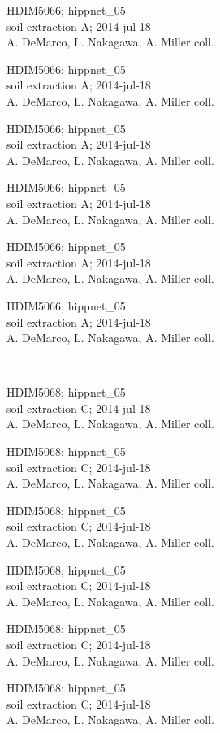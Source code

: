 \documentclass[2pt]{extarticle}
\begin{document}
\noindent
\parbox{0.16\textwidth}{\tiny \raggedright \rule[-0.3\baselineskip]{0pt}{10pt}HDIM5066; hippnet\_05\\ soil extraction A; 2014-jul-18\\ A. DeMarco, L. Nakagawa, A. Miller coll.}
\parbox{0.16\textwidth}{\tiny \raggedright \rule[-0.3\baselineskip]{0pt}{10pt}HDIM5066; hippnet\_05\\ soil extraction A; 2014-jul-18\\ A. DeMarco, L. Nakagawa, A. Miller coll.}
\parbox{0.16\textwidth}{\tiny \raggedright \rule[-0.3\baselineskip]{0pt}{10pt}HDIM5066; hippnet\_05\\ soil extraction A; 2014-jul-18\\ A. DeMarco, L. Nakagawa, A. Miller coll.}
\parbox{0.16\textwidth}{\tiny \raggedright \rule[-0.3\baselineskip]{0pt}{10pt}HDIM5066; hippnet\_05\\ soil extraction A; 2014-jul-18\\ A. DeMarco, L. Nakagawa, A. Miller coll.}
\parbox{0.16\textwidth}{\tiny \raggedright \rule[-0.3\baselineskip]{0pt}{10pt}HDIM5066; hippnet\_05\\ soil extraction A; 2014-jul-18\\ A. DeMarco, L. Nakagawa, A. Miller coll.}
\parbox{0.16\textwidth}{\tiny \raggedright \rule[-0.3\baselineskip]{0pt}{10pt}HDIM5066; hippnet\_05\\ soil extraction A; 2014-jul-18\\ A. DeMarco, L. Nakagawa, A. Miller coll.} \\ 
\vspace{0.001in} 

\noindent
\parbox{0.16\textwidth}{\tiny \raggedright \rule[-0.3\baselineskip]{0pt}{10pt}HDIM5068; hippnet\_05\\ soil extraction C; 2014-jul-18\\ A. DeMarco, L. Nakagawa, A. Miller coll.}
\parbox{0.16\textwidth}{\tiny \raggedright \rule[-0.3\baselineskip]{0pt}{10pt}HDIM5068; hippnet\_05\\ soil extraction C; 2014-jul-18\\ A. DeMarco, L. Nakagawa, A. Miller coll.}
\parbox{0.16\textwidth}{\tiny \raggedright \rule[-0.3\baselineskip]{0pt}{10pt}HDIM5068; hippnet\_05\\ soil extraction C; 2014-jul-18\\ A. DeMarco, L. Nakagawa, A. Miller coll.}
\parbox{0.16\textwidth}{\tiny \raggedright \rule[-0.3\baselineskip]{0pt}{10pt}HDIM5068; hippnet\_05\\ soil extraction C; 2014-jul-18\\ A. DeMarco, L. Nakagawa, A. Miller coll.}
\parbox{0.16\textwidth}{\tiny \raggedright \rule[-0.3\baselineskip]{0pt}{10pt}HDIM5068; hippnet\_05\\ soil extraction C; 2014-jul-18\\ A. DeMarco, L. Nakagawa, A. Miller coll.}
\parbox{0.16\textwidth}{\tiny \raggedright \rule[-0.3\baselineskip]{0pt}{10pt}HDIM5068; hippnet\_05\\ soil extraction C; 2014-jul-18\\ A. DeMarco, L. Nakagawa, A. Miller coll.} \\ 
\vspace{0.001in} 
\end{document}
